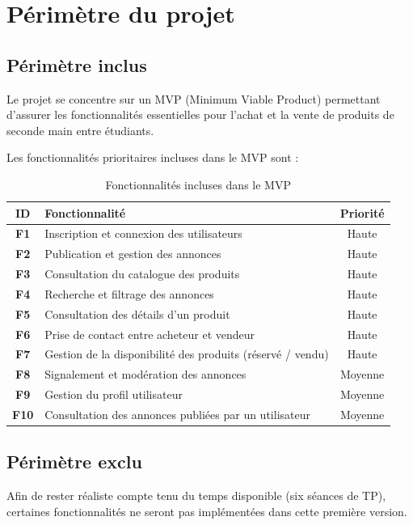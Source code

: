 ﻿\chapter{Périmètre du projet}

\section{Périmètre inclus}

Le projet se concentre sur un MVP (Minimum Viable Product) permettant d'assurer les fonctionnalités essentielles pour l'achat et la vente de produits de seconde main entre étudiants.

Les fonctionnalités prioritaires incluses dans le MVP sont :

\begin{table}[h]
\centering
\renewcommand{\arraystretch}{1.25}
\begin{tabularx}{\textwidth}{>{\bfseries}c X c}
\toprule
\textbf{ID} & \textbf{Fonctionnalité} & \textbf{Priorité} \\
\midrule
F1 & Inscription et connexion des utilisateurs & Haute \\
F2 & Publication et gestion des annonces & Haute \\
F3 & Consultation du catalogue des produits & Haute \\
F4 & Recherche et filtrage des annonces & Haute \\
F5 & Consultation des détails d'un produit & Haute \\
F6 & Prise de contact entre acheteur et vendeur & Haute \\
F7 & Gestion de la disponibilité des produits (réservé / vendu) & Haute \\
F8 & Signalement et modération des annonces & Moyenne \\
F9 & Gestion du profil utilisateur & Moyenne \\
F10 & Consultation des annonces publiées par un utilisateur & Moyenne \\
\bottomrule
\end{tabularx}
\caption{Fonctionnalités incluses dans le MVP}
\end{table}

\section{Périmètre exclu}

Afin de rester réaliste compte tenu du temps disponible (six séances de TP), certaines fonctionnalités ne seront pas implémentées dans cette première version.

